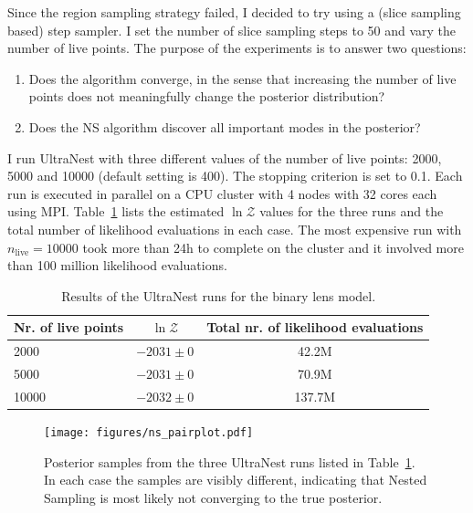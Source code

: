 \documentclass[12pt,dvipsnames]{report}
\newcommand{\ssf}[1]{\textsf{#1}}
\begin{document}
Since the region sampling strategy failed, I decided to try using a (slice sampling based)
step sampler.
I set the number of slice sampling steps to 50 and vary the number of live points. 
The purpose of the experiments is to answer two questions:
\begin{enumerate}
    \item Does the algorithm converge, in the sense that increasing the number of live points
    does not meaningfully change the posterior distribution?
    \item Does the NS algorithm discover all important modes in the posterior?
\end{enumerate}
I run \ssf{UltraNest} with three different values of the number of live points: 2000, 5000 and
10000 (default setting is 400). The stopping criterion is set to 0.1. 
Each run is executed in parallel on a CPU cluster with 4 nodes with 32 cores each using MPI.
Table~\ref{tab:results_ns} lists the estimated  $\ln\mathcal{Z}$ values for the three 
runs and the total number of likelihood evaluations in each case. 
The most expensive run 
with $n_\mathrm{live}=10000$ took more than 24h to complete on the cluster and it involved 
more than 100 million likelihood evaluations. 
\begin{table}[h!]
\centering
\begin{tabular}{lcc}
 \toprule
Nr. of live points& $\ln\mathcal{Z}$& Total nr. of likelihood evaluations\\
 \midrule
2000 & $-2031\pm 0$ & 42.2M\\
5000 & $-2031\pm 0$ & 70.9M\\
10000 & $-2032 \pm 0$ & 137.7M\\
 \bottomrule
\end{tabular}
\caption{ Results of the \ssf{UltraNest} runs for the binary lens model.}
\label{tab:results_ns}
\end{table}

\begin{figure}[t]
\begin{centering}
        \texttt{[image: figures/ns\_pairplot.pdf]}
        \caption{
            Posterior samples from the three \ssf{UltraNest} runs listed in 
            Table~\ref{tab:results_ns}. In each case the samples are visibly different,
            indicating that Nested Sampling is most likely not converging to the true posterior.
        }
            \label{fig:ns_pairplot}
    \end{centering}
\end{figure}
\end{document}
